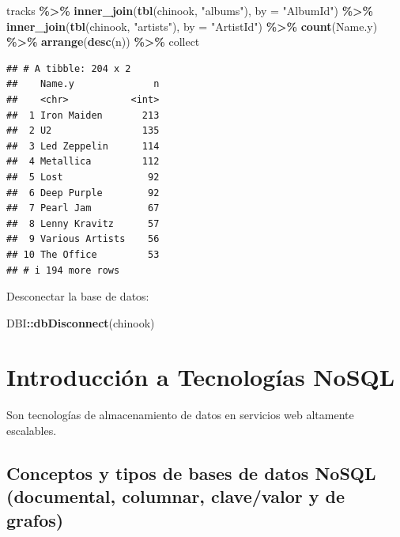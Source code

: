 \documentclass[
]{book}
\newenvironment{Shaded}{\begin{snugshade}}{\end{snugshade}}
\newcommand{\AttributeTok}[1]{\textcolor[rgb]{0.13,0.29,0.53}{#1}}
\newcommand{\FunctionTok}[1]{\textcolor[rgb]{0.13,0.29,0.53}{\textbf{#1}}}
\newcommand{\NormalTok}[1]{#1}
\newcommand{\SpecialCharTok}[1]{\textcolor[rgb]{0.81,0.36,0.00}{\textbf{#1}}}
\newcommand{\StringTok}[1]{\textcolor[rgb]{0.31,0.60,0.02}{#1}}
\begin{document}
\begin{enumerate}
\begin{Shaded}
\begin{Highlighting}[]
\NormalTok{tracks }\SpecialCharTok{\%\textgreater{}\%} \FunctionTok{inner\_join}\NormalTok{(}\FunctionTok{tbl}\NormalTok{(chinook, }\StringTok{"albums"}\NormalTok{), }\AttributeTok{by =} \StringTok{"AlbumId"}\NormalTok{) }\SpecialCharTok{\%\textgreater{}\%} 
    \FunctionTok{inner\_join}\NormalTok{(}\FunctionTok{tbl}\NormalTok{(chinook, }\StringTok{"artists"}\NormalTok{), }\AttributeTok{by =} \StringTok{"ArtistId"}\NormalTok{) }\SpecialCharTok{\%\textgreater{}\%} 
    \FunctionTok{count}\NormalTok{(Name.y) }\SpecialCharTok{\%\textgreater{}\%} \FunctionTok{arrange}\NormalTok{(}\FunctionTok{desc}\NormalTok{(n)) }\SpecialCharTok{\%\textgreater{}\%}\NormalTok{ collect}
\end{Highlighting}
\end{Shaded}

\begin{verbatim}
## # A tibble: 204 x 2
##    Name.y              n
##    <chr>           <int>
##  1 Iron Maiden       213
##  2 U2                135
##  3 Led Zeppelin      114
##  4 Metallica         112
##  5 Lost               92
##  6 Deep Purple        92
##  7 Pearl Jam          67
##  8 Lenny Kravitz      57
##  9 Various Artists    56
## 10 The Office         53
## # i 194 more rows
\end{verbatim}
\end{enumerate}

Desconectar la base de datos:

\begin{Shaded}
\begin{Highlighting}[]
\NormalTok{DBI}\SpecialCharTok{::}\FunctionTok{dbDisconnect}\NormalTok{(chinook)            }
\end{Highlighting}
\end{Shaded}

\chapter{Introducción a Tecnologías NoSQL}\label{introducciuxf3n-a-tecnologuxedas-nosql}

Son tecnologías de almacenamiento de datos en servicios web altamente escalables.

\section{Conceptos y tipos de bases de datos NoSQL (documental, columnar, clave/valor y de grafos)}\label{conceptos-y-tipos-de-bases-de-datos-nosql-documental-columnar-clavevalor-y-de-grafos}
\end{document}
